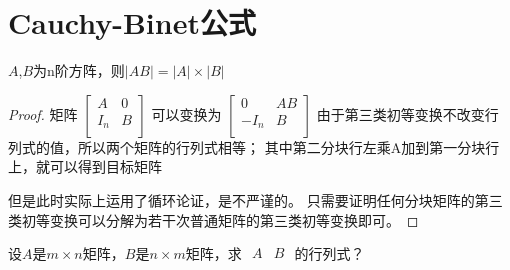 \section{Cauchy-Binet公式}
\begin{theorem}{}{}
$A$,$B$为n阶方阵，则$|AB|=|A|\times|B|$
\end{theorem}
\begin{proof}{}{}
矩阵
$\begin{bmatrix}
A & 0 \\
I_n & B \\
\end{bmatrix}$ 
可以变换为
$\begin{bmatrix}
0 & AB \\
-I_n & B \\
\end{bmatrix}$
由于第三类初等变换不改变行列式的值，所以两个矩阵的行列式相等；
其中第二分块行左乘A加到第一分块行上，就可以得到目标矩阵

但是此时实际上运用了循环论证，是不严谨的。
只需要证明任何分块矩阵的第三类初等变换可以分解为若干次普通矩阵的第三类初等变换即可。
\end{proof}

设$A$是$m\times n$矩阵，$B$是$n\times m$矩阵，求
$\begin{matrix}
A & B \\
\end{matrix}$
的行列式？

